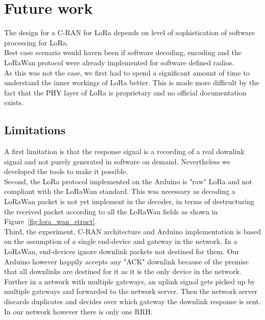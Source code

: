 \chapter{Future work}
The design for a C-RAN for LoRa depends on level of sophistication of
software processing for LoRa. \\
Best case scenario would haven been if software decoding, encoding and the LoRaWan protocol
were already implemented for software defined radios.
\\
As this was not the case, we first had to spend a significant amount of time 
to understand the inner workings of LoRa better. This is made more difficult by the fact 
that the PHY layer of LoRa is proprietary and no official documentation exists.

\section{Limitations}
A first limitation is that the response signal is a recording of a real downlink signal and not 
purely generated in software on demand. Nevertheless we developed the tools to make it possible.
\\
Second, the LoRa protocol implemented on the Arduino is "raw" LoRa and not compliant 
with the LoRaWan standard. This was necessary as decoding a LoRaWan packet is not yet implement in 
the decoder, in terms of destructuring the received packet according to all the LoRaWan fields as shown
in Figure~\ref{fig:lora_wan_struct}.
\\
Third, the experiment, C-RAN architecture and Arduino implementation is based on the assumption 
of a single end-device and gateway in the network. In a LoRaWan, end-devices ignore downlink packets
not destined for them. Our Arduino however happily accepts any "ACK" downlink because of the premise that 
all downlinks are destined for it as it is the only device in the network.\\
Further in a network with multiple gateways, an uplink signal gets picked up by multiple gateways and 
forwarded to the network server. Then the network server discards duplicates and decides over which gateway
the downlink response is sent. In our network however there is only one RRH.

